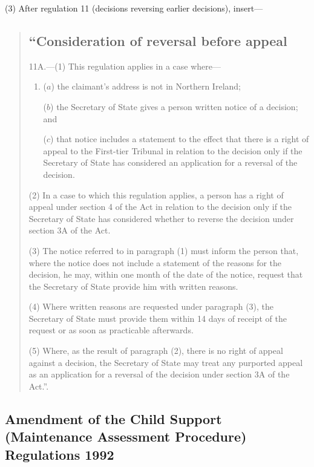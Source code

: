 \documentclass[12pt,a4paper]{article}
\begin{document}
(3) After regulation 11 (decisions reversing earlier decisions), insert—
\begin{quotation}
\subsection*{“Consideration of reversal before appeal}

11A.---(1)  This regulation applies in a case where—
\begin{enumerate}\item[]
($a$) the claimant’s address is not in Northern Ireland;

($b$) the Secretary of State gives a person written notice of a decision; and

($c$) that notice includes a statement to the effect that there is a right of appeal to the First-tier Tribunal in relation to the decision only if the Secretary of State has considered an application for a reversal of the decision.
\end{enumerate}

(2) In a case to which this regulation applies, a person has a right of appeal under section 4 of the Act in relation to the decision only if the Secretary of State has considered whether to reverse the decision under section 3A of the Act.

(3) The notice referred to in paragraph (1) must inform the person that, where the notice does not include a statement of the reasons for the decision, he may, within one month of the date of the notice, request that the Secretary of State provide him with written reasons.

(4) Where written reasons are requested under paragraph (3), the Secretary of State must provide them within 14 days of receipt of the request or as soon as practicable afterwards.

(5) Where, as the result of paragraph (2), there is no right of appeal against a decision, the Secretary of State may treat any purported appeal as an application for a reversal of the decision under section 3A of the Act.”.
\end{quotation}

\subsection[3. Amendment of the Child Support (Maintenance Assessment Procedure) Regulations 1992]{Amendment of the Child Support (Maintenance Assessment Procedure) Regulations 1992}
\end{document}
